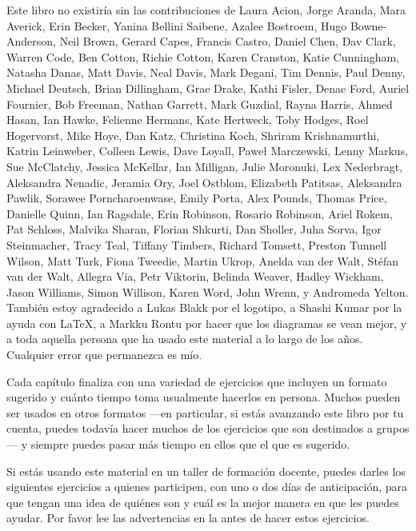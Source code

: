 
Este libro no existiría sin las contribuciones de
Laura Acion,
Jorge Aranda,
Mara Averick,
Erin Becker,
Yanina Bellini Saibene,
Azalee Bostroem,
Hugo Bowne-Anderson,
Neil Brown,
Gerard Capes,
Francis Castro,
Daniel Chen,
Dav Clark,
Warren Code,
Ben Cotton,
Richie Cotton,
Karen Cranston,
Katie Cunningham,
Natasha Danas,
Matt Davis,
Neal Davis,
Mark Degani,
Tim Dennis,
Paul Denny,
Michael Deutsch,
Brian Dillingham,
Grae Drake,
Kathi Fisler,
Denae Ford,
Auriel Fournier,
Bob Freeman,
Nathan Garrett,
Mark Guzdial,
Rayna Harris,
Ahmed Hasan,
Ian Hawke,
Felienne Hermans,
Kate Hertweck,
Toby Hodges,
Roel Hogervorst,
Mike Hoye,
Dan Katz,
Christina Koch,
Shriram Krishnamurthi,
Katrin Leinweber,
Colleen Lewis,
Dave Loyall,
Paweł Marczewski,
Lenny Markus,
Sue McClatchy,
Jessica McKellar,
Ian Milligan,
Julie Moronuki,
Lex Nederbragt,
Aleksandra Nenadic,
Jeramia Ory,
Joel Ostblom,
Elizabeth Patitsas,
Aleksandra Pawlik,
Sorawee Porncharoenwase,
Emily Porta,
Alex Pounds,
Thomas Price,
Danielle Quinn,
Ian Ragsdale,
Erin Robinson,
Rosario Robinson,
Ariel Rokem,
Pat Schloss,
Malvika Sharan,
Florian Shkurti,
Dan Sholler,
Juha Sorva,
Igor Steinmacher,
Tracy Teal,
Tiffany Timbers,
Richard Tomsett,
Preston Tunnell Wilson,
Matt Turk,
Fiona Tweedie,
Martin Ukrop,
Anelda van der Walt,
Stéfan van der Walt,
Allegra Via,
Petr Viktorin,
Belinda Weaver,
Hadley Wickham,
Jason Williams,
Simon Willison,
Karen Word,
John Wrenn,
y Andromeda Yelton.
También estoy agradecido a Lukas Blakk por el logotipo,
a Shashi Kumar por la ayuda con LaTeX,
a Markku Rontu por hacer que los diagramas se vean mejor,
y a toda aquella persona que ha usado este material a lo largo de los años.
Cualquier error que permanezca es mío. 


Cada capítulo finaliza con una variedad de ejercicios que incluyen un formato sugerido y cuánto tiempo toma usualmente hacerlos en persona.
Muchos pueden ser usados en otros formatos ---en particular,
si estás avanzando este libro por tu cuenta,
puedes todavía hacer muchos de los ejercicios que son destinados a grupos--- y siempre
puedes pasar más tiempo en ellos que el que es sugerido.

Si estás usando este material en un taller de formación docente,
puedes darles los siguientes ejercicios a quienes participen, con uno o dos días de anticipación,
para que tengan una idea de quiénes son y cuál es la mejor manera en que les puedes ayudar. 
Por favor lee las advertencias en la  antes de hacer estos ejercicios.

